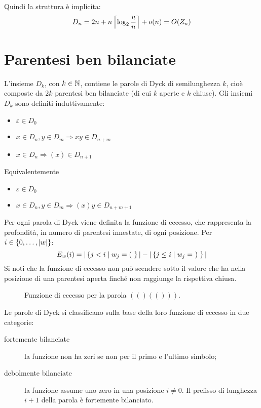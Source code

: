 Quindi la struttura è implicita:
\begin{equation*}
	D_n = 2n+n\left\lceil \log_2\frac un \right\rceil+o(n) = O(Z_n)
\end{equation*}



\section{Parentesi ben bilanciate}
L'insieme $D_k$, con $k\in\mathbb N$, contiene le parole di Dyck di semilunghezza $k$, cioè composte da $2k$ parentesi ben bilanciate (di cui $k$ aperte e $k$ chiuse). Gli insiemi $D_k$ sono definiti induttivamente:
\begin{itemize}
	\item $\varepsilon\in D_0$
	\item $x\in D_n,y\in D_m\Rightarrow xy\in D_{n+m}$
	\item $x\in D_n\Rightarrow (x)\in D_{n+1}$
\end{itemize}
Equivalentemente
\begin{itemize}
	\item $\varepsilon\in D_0$
	\item $x\in D_n,y\in D_m\Rightarrow (x)y\in D_{n+m+1}$
\end{itemize}

Per ogni parola di Dyck viene definita la funzione di eccesso, che rappresenta la profondità, in numero di parentesi innestate, di ogni posizione. Per $i\in\left\{ 0,\dots,|w| \right\}$:
\begin{equation*}
	E_w(i) = | \left\{ j < i \mid w_j = (~  \right\} | - | \left\{ j\leq i \mid w_j =~)~  \right\} |
\end{equation*}
Si noti che la funzione di eccesso non può scendere sotto il valore che ha nella posizione di una parentesi aperta finché non raggiunge la rispettiva chiusa.

\begin{figure}[ht]
	\centering
	
	\caption{Funzione di eccesso per la parola $(()(()))$.}
	\label{fig:func_excess}
\end{figure}

Le parole di Dyck si classificano sulla base della loro funzione di eccesso in due categorie:
\begin{description}
	\item[fortemente bilanciate] la funzione non ha zeri se non per il primo e l'ultimo simbolo;
	\item[debolmente bilanciate] la funzione assume uno zero in una posizione $i\neq0$. Il prefisso di lunghezza $i+1$ della parola è fortemente bilanciato.
\end{description}

